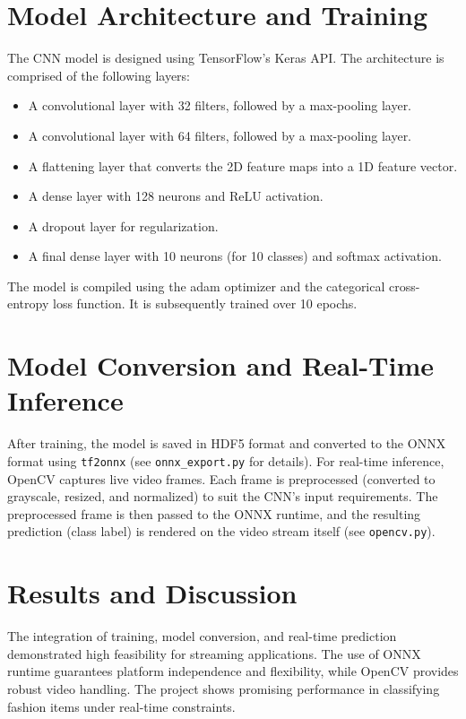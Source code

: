 \documentclass[conference]{IEEEtran}
\begin{document}
\section{Model Architecture and Training}
The CNN model is designed using TensorFlow's Keras API. The architecture is comprised of the following layers:
\begin{itemize}
    \item A convolutional layer with 32 filters, followed by a max-pooling layer.
    \item A convolutional layer with 64 filters, followed by a max-pooling layer.
    \item A flattening layer that converts the 2D feature maps into a 1D feature vector.
    \item A dense layer with 128 neurons and ReLU activation.
    \item A dropout layer for regularization.
    \item A final dense layer with 10 neurons (for 10 classes) and softmax activation.
\end{itemize}

The model is compiled using the adam optimizer and the categorical cross-entropy loss function. It is subsequently trained over 10 epochs.

\section{Model Conversion and Real-Time Inference}
After training, the model is saved in HDF5 format and converted to the ONNX format using \texttt{tf2onnx} (see \texttt{onnx\_export.py} for details). For real-time inference, OpenCV captures live video frames. Each frame is preprocessed (converted to grayscale, resized, and normalized) to suit the CNN's input requirements. The preprocessed frame is then passed to the ONNX runtime, and the resulting prediction (class label) is rendered on the video stream itself (see \texttt{opencv.py}).

\section{Results and Discussion}
The integration of training, model conversion, and real-time prediction demonstrated high feasibility for streaming applications. The use of ONNX runtime guarantees platform independence and flexibility, while OpenCV provides robust video handling. The project shows promising performance in classifying fashion items under real-time constraints.
\end{document}
